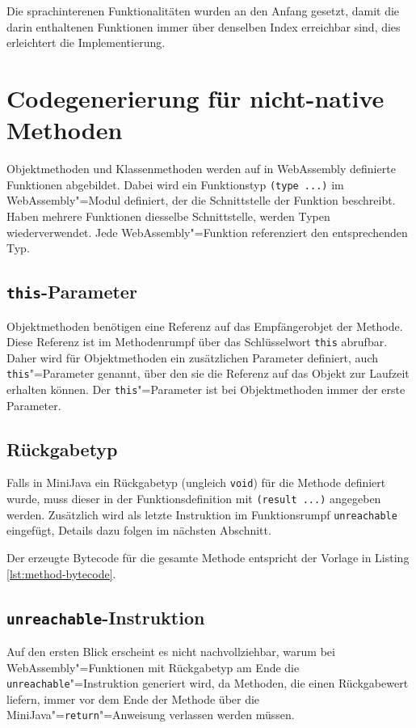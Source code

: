 Die sprachinterenen Funktionalitäten wurden an den Anfang gesetzt, damit die darin enthaltenen Funktionen immer über denselben Index erreichbar sind, dies erleichtert die Implementierung.

\section{Codegenerierung für nicht-native Methoden}

Objektmethoden und Klassenmethoden werden auf in WebAssembly definierte Funktionen abgebildet. Dabei wird ein Funktionstyp \lstinline{(type ...)} im WebAssembly"=Modul definiert, der die Schnittstelle der Funktion beschreibt. Haben mehrere Funktionen diesselbe Schnittstelle, werden Typen wiederverwendet. Jede WebAssembly"=Funktion referenziert den entsprechenden Typ.

\subsection{\lstinline{this}-Parameter}
\label{subsec:this-Parameter}
Objektmethoden benötigen eine Referenz auf das Empfängerobjet der Methode. Diese Referenz ist im Methodenrumpf über das Schlüsselwort \lstinline{this} abrufbar. Daher wird für Objektmethoden ein zusätzlichen Parameter definiert, auch \lstinline{this}"=Parameter genannt, über den sie die Referenz auf das Objekt zur Laufzeit erhalten können. Der \lstinline{this}"=Parameter ist bei Objektmethoden immer der erste Parameter.

\subsection{Rückgabetyp}
Falls in MiniJava ein Rückgabetyp (ungleich \lstinline{void}) für die Methode definiert wurde, muss dieser in der Funktionsdefinition mit \lstinline{(result ...)} angegeben werden. Zusätzlich wird als letzte Instruktion im Funktionsrumpf \lstinline{unreachable} eingefügt, Details dazu folgen im nächsten Abschnitt.

Der erzeugte Bytecode für die gesamte Methode entspricht der Vorlage in Listing \ref{lst:method-bytecode}.



\subsection{\lstinline{unreachable}-Instruktion}
Auf den ersten Blick erscheint es nicht nachvollziehbar, warum bei WebAssembly"=Funktionen mit Rückgabetyp am Ende die \lstinline{unreachable}"=Instruktion generiert wird, da Methoden, die einen Rückgabewert liefern, immer vor dem Ende der Methode über die MiniJava"=\lstinline{return}"=Anweisung verlassen werden müssen.

